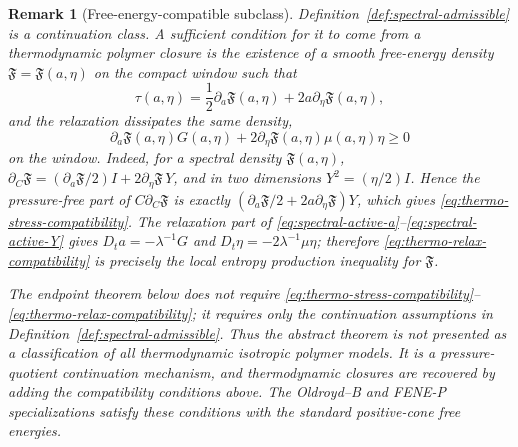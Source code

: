 \documentclass[11pt]{article}
\newtheorem{remark}{Remark}[section]
\begin{document}
\begin{remark}[Free-energy-compatible subclass]
\label{rem:thermodynamic-subclass}
Definition~\ref{def:spectral-admissible} is a continuation class.  A sufficient
condition for it to come from a thermodynamic polymer closure is the existence
of a smooth free-energy density
\(\mathfrak F=\mathfrak F(a,\eta)\) on the compact window such that
\begin{equation}
  \tau(a,\eta)=\frac12\partial_a\mathfrak F(a,\eta)
  +2a\partial_\eta\mathfrak F(a,\eta),
  \label{eq:thermo-stress-compatibility}
\end{equation}
and the relaxation dissipates the same density,
\begin{equation}
  \partial_a\mathfrak F(a,\eta)G(a,\eta)
  +2\partial_\eta\mathfrak F(a,\eta)\mu(a,\eta)\eta\ge0
  \label{eq:thermo-relax-compatibility}
\end{equation}
on the window.  Indeed, for a spectral density \(\mathfrak F(a,\eta)\),
\(\partial_C\mathfrak F=(\partial_a\mathfrak F/2)I
+2\partial_\eta\mathfrak F\,Y\), and in two dimensions
\(Y^2=(\eta/2)I\).  Hence the pressure-free part of
\(C\partial_C\mathfrak F\) is exactly
\((\partial_a\mathfrak F/2+2a\partial_\eta\mathfrak F)Y\), which gives
\eqref{eq:thermo-stress-compatibility}.  The relaxation part of
\eqref{eq:spectral-active-a}--\eqref{eq:spectral-active-Y} gives
\(D_ta=-\lambda^{-1}G\) and
\(D_t\eta=-2\lambda^{-1}\mu\eta\); therefore
\eqref{eq:thermo-relax-compatibility} is precisely the local entropy
production inequality for \(\mathfrak F\).

The endpoint theorem below does not require
\eqref{eq:thermo-stress-compatibility}--\eqref{eq:thermo-relax-compatibility};
it requires only the continuation assumptions in
Definition~\ref{def:spectral-admissible}.  Thus the abstract theorem is not
presented as a classification of all thermodynamic isotropic polymer models.
It is a pressure-quotient continuation mechanism, and thermodynamic closures
are recovered by adding the compatibility conditions above.  The Oldroyd--B and
FENE-P specializations satisfy these conditions with the standard positive-cone
free energies.

\end{remark}
\end{document}
